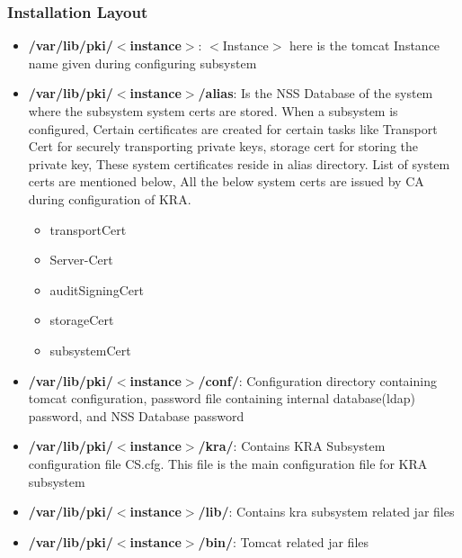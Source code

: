 \documentclass[12pt]{report}
\begin{document}
\subsubsection{Installation Layout}
\begin{itemize}
    \item \textbf{/var/lib/pki/$<$instance$>$}: $<$Instance$>$ here is the tomcat Instance name 
        given during configuring subsystem
    \item \textbf{/var/lib/pki/$<$instance$>$/alias}: Is the NSS Database of the system where the subsystem system 
        certs are stored. When a subsystem is configured, Certain certificates are created for certain tasks 
        like Transport Cert for securely transporting private keys, storage cert for storing the private key, 
        These system certificates reside in alias directory. List of system certs are mentioned below, 
        All the below system certs are issued by CA during configuration of KRA.
        \begin{itemize}
            \item transportCert
            \item Server-Cert
            \item auditSigningCert
            \item storageCert
            \item subsystemCert
        \end{itemize}
    \item \textbf{/var/lib/pki/$<$instance$>$/conf/}: Configuration directory containing tomcat configuration,
        password file containing internal database(ldap) password, and NSS Database password
    \item \textbf{/var/lib/pki/$<$instance$>$/kra/}: Contains KRA Subsystem configuration file CS.cfg. This file is
        the main configuration file for KRA subsystem
    \item \textbf{/var/lib/pki/$<$instance$>$/lib/}: Contains kra subsystem related jar files 
    \item \textbf{/var/lib/pki/$<$instance$>$/bin/}: Tomcat related jar files
\end{itemize}
\end{document}
